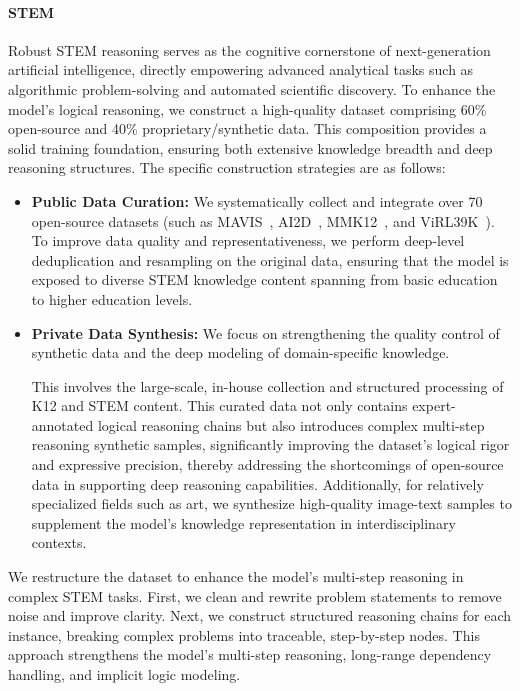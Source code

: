 \documentclass{article}
\begin{document}
\paragraph{STEM} 

Robust STEM reasoning serves as the cognitive cornerstone of next-generation artificial intelligence, directly empowering advanced analytical tasks such as algorithmic problem-solving and automated scientific discovery.
To enhance the model's logical reasoning, we construct a high-quality dataset comprising 60\% open-source and 40\% proprietary/synthetic data. This composition provides a solid training foundation, ensuring both extensive knowledge breadth and deep reasoning structures. The specific construction strategies are as follows:
\begin{itemize}
\item \textbf{Public Data Curation:} We systematically collect and integrate over 70 open-source datasets (such as MAVIS~\cite{DBLP:conf/iclr/ZhangWJGZT0ZZG025}, AI2D~\cite{DBLP:conf/eccv/KembhaviSKSHF16}, 
MMK12~\cite{DBLP:journals/corr/abs-2503-07365}, and ViRL39K~\cite{DBLP:journals/corr/abs-2504-08837}). To improve data quality and representativeness, we perform deep-level deduplication and resampling on the original data, ensuring that the model is exposed to diverse STEM knowledge content spanning from basic education to higher education levels.
\item \textbf{Private Data Synthesis:} We focus on strengthening the quality control of synthetic data and the deep modeling of domain-specific knowledge. 

This involves the large-scale, in-house collection and structured processing of K12 and STEM content.
This curated data not only contains expert-annotated logical reasoning chains but also introduces complex multi-step reasoning synthetic samples, significantly improving the dataset's logical rigor and expressive precision, thereby addressing the shortcomings of open-source data in supporting deep reasoning capabilities. Additionally, for relatively specialized fields such as art, we synthesize high-quality image-text samples to supplement the model's knowledge representation in interdisciplinary contexts.
\end{itemize}

We restructure the dataset to enhance the model's multi-step reasoning in complex STEM tasks. First, we clean and rewrite problem statements to remove noise and improve clarity. Next, we construct structured reasoning chains for each instance, breaking complex problems into traceable, step-by-step nodes. This approach strengthens the model's multi-step reasoning, long-range dependency handling, and implicit logic modeling.
\end{document}
